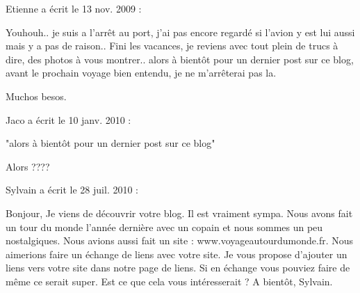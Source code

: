 \medskip
Etienne a écrit le 13 nov. 2009 :
\begin{displayquote}
Youhouh.. je suis a l'arrêt au port, j'ai pas encore regardé si l'avion y est lui aussi mais y a pas de raison..
Fini les vacances, je reviens avec tout plein de trucs à dire, des photos à vous montrer.. alors à bientôt pour un dernier post sur ce blog, avant le prochain voyage bien entendu, je ne m'arrêterai pas la.

Muchos besos.
\end{displayquote}

\medskip
Jaco a écrit le 10 janv. 2010 :
\begin{displayquote}
"alors à bientôt pour un dernier post sur ce blog"

Alors ????
\end{displayquote}

\medskip
Sylvain a écrit le 28 juil. 2010 :
\begin{displayquote}
Bonjour,
Je viens de découvrir votre blog. Il est vraiment sympa. Nous avons fait un tour du monde l'année dernière avec un copain et nous sommes un peu nostalgiques.
Nous avions aussi fait un site : www.voyageautourdumonde.fr. Nous aimerions faire un échange de liens avec votre site. Je vous propose d'ajouter un liens vers votre site dans notre page de liens. Si en échange vous pouviez faire de même ce serait super.
Est ce que cela vous intéresserait ?
A bientôt,
Sylvain.
\end{displayquote}

\vfill
